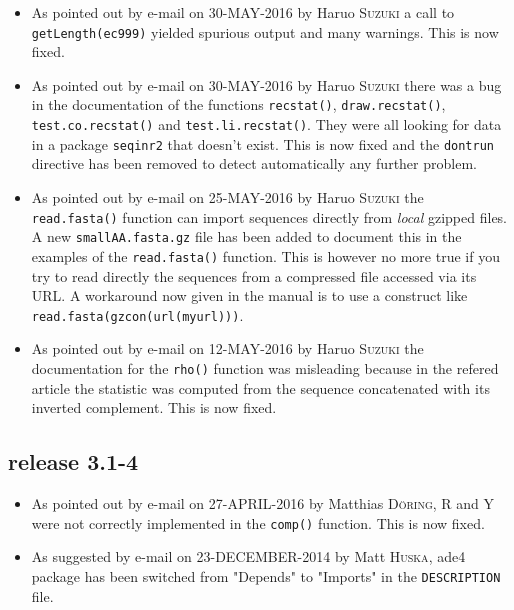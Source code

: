 \documentclass{article}
\begin{document}
\begin{itemize}

\item As pointed out by e-mail on 30-MAY-2016 by Haruo \textsc{Suzuki} a
call to \texttt{getLength(ec999)} yielded spurious output and
many warnings. This is now fixed.

\item As pointed out by e-mail on 30-MAY-2016 by Haruo \textsc{Suzuki} there 
was a bug in the documentation of the functions \texttt{recstat()},
\texttt{draw.recstat()}, \texttt{test.co.recstat()} and
\texttt{test.li.recstat()}. They were all looking for data in
a package \texttt{seqinr2} that doesn't exist. This is now
fixed and the \texttt{dontrun} directive has been removed to
detect automatically any further problem.

\item As pointed out by e-mail on 25-MAY-2016 by Haruo \textsc{Suzuki} the
\texttt{read.fasta()} function can import sequences directly from
\textit{local} gzipped files. A new \texttt{smallAA.fasta.gz} file
has been added to document this in the examples of the
\texttt{read.fasta()} function. This is however no more true if
you try to read directly the sequences from a compressed file
accessed via its URL. A workaround now given in the manual
is to use a construct like \texttt{read.fasta(gzcon(url(myurl)))}.

\item As pointed out by e-mail on 12-MAY-2016 by Haruo \textsc{Suzuki} the
documentation for the \texttt{rho()} function was misleading
because in the refered article \cite{KarlinS1994} the statistic
was computed from the sequence concatenated with its inverted complement.
This is now fixed.

\end{itemize}

\subsection*{release 3.1-4}

\begin{itemize}

\item As pointed out by e-mail on 27-APRIL-2016 by Matthias \textsc{D\"oring}, R and Y were not correctly implemented in the  \texttt{comp()} function. This is now fixed.


\item As suggested by e-mail on 23-DECEMBER-2014 by Matt \textsc{Huska}, ade4 package has been switched from "Depends" to "Imports" in the \texttt{DESCRIPTION} file.


\end{itemize}
\end{document}
